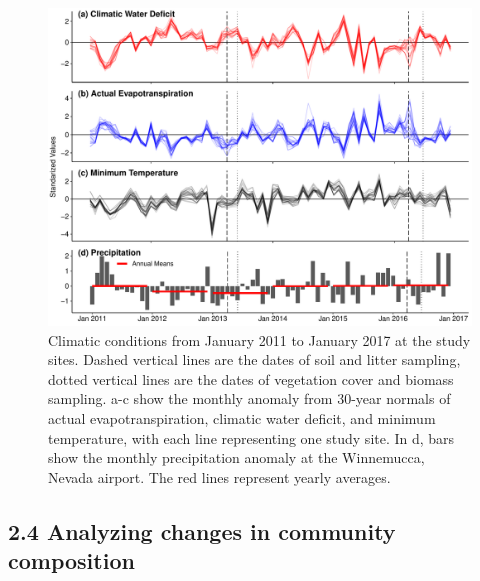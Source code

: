 \documentclass[
  11pt,
  a4paper,
]{article}
\begin{document}
\begin{figure}
\centering
\includegraphics{figures/figure_1_climate.pdf}
\caption{Climatic conditions from January 2011 to January 2017 at the study sites. Dashed vertical lines are the dates of soil and litter sampling, dotted vertical lines are the dates of vegetation cover and biomass sampling. a-c show the monthly anomaly from 30-year normals of actual evapotranspiration, climatic water deficit, and minimum temperature, with each line representing one study site. In d, bars show the monthly precipitation anomaly at the Winnemucca, Nevada airport. The red lines represent yearly averages.}
\end{figure}

\hypertarget{analyzing-changes-in-community-composition}{%
\subsection{2.4 Analyzing changes in community composition}\label{analyzing-changes-in-community-composition}}
\end{document}
